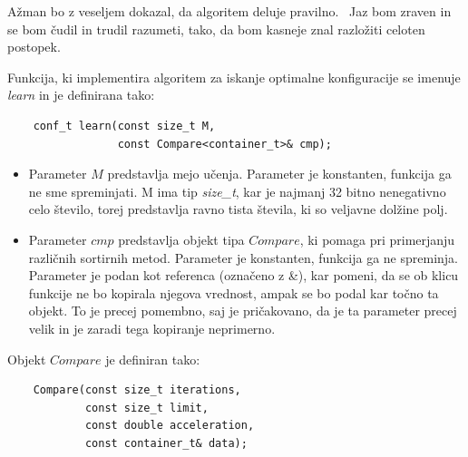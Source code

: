 \documentclass[a4paper,oneside,12pt]{article}
\begin{document}
Ažman bo z veseljem dokazal, da algoritem deluje pravilno. \smiley\  
Jaz bom zraven in se bom čudil in trudil razumeti, tako, da bom kasneje znal razložiti
celoten postopek. \blacksmiley

Funkcija, ki implementira algoritem za iskanje optimalne konfiguracije 
se imenuje \emph{learn} in je definirana tako:


\begin{lstlisting}
    conf_t learn(const size_t M, 
                 const Compare<container_t>& cmp);
\end{lstlisting}

\begin{itemize}
  \item Parameter $M$ predstavlja mejo učenja. Parameter je
    konstanten, funkcija ga ne sme spreminjati. M ima tip \emph{size\_t}, kar je najmanj 32
    bitno nenegativno celo število, torej predstavlja ravno tista števila, ki so veljavne
    dolžine polj.
  \item Parameter $cmp$ predstavlja objekt tipa $Compare$, ki pomaga pri primerjanju
    različnih sortirnih metod. Parameter je konstanten, funkcija ga ne spreminja.
    Parameter je podan kot referenca (označeno z \&), kar pomeni, da se ob klicu funkcije
    ne bo kopirala njegova vrednost, ampak se bo podal kar točno ta objekt. To je precej
    pomembno, saj je pričakovano, da je ta parameter precej velik in je zaradi tega
    kopiranje neprimerno. 
\end{itemize}

Objekt $Compare$ je definiran tako:
\begin{lstlisting}
    Compare(const size_t iterations, 
            const size_t limit, 
            const double acceleration, 
            const container_t& data);
\end{lstlisting}
\end{document}

